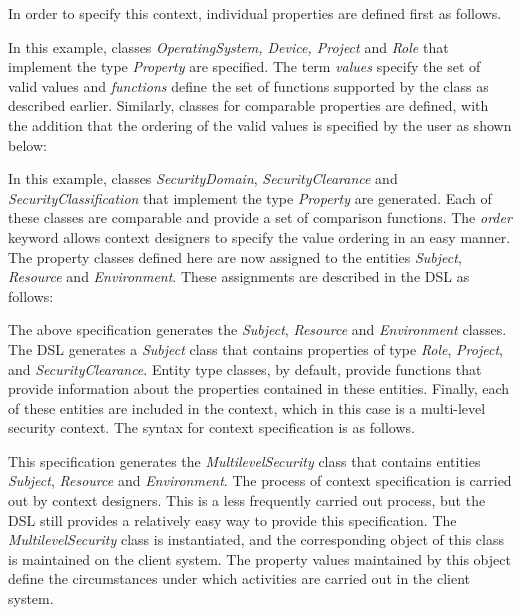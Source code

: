 In order to specify this context, individual properties are defined first as follows. 


	
In this example, classes  {\em OperatingSystem, Device, Project} and {\em Role} that implement the type {\em Property} are specified. The term {\em values} specify the set of valid values and {\em functions} define the set of functions supported by the class as described earlier. Similarly, classes for comparable properties are defined, with the addition that the ordering of the valid values is specified by the user as shown below: 



In this example, classes {\em SecurityDomain}, {\em SecurityClearance} and {\em SecurityClassification} that implement the type {\em Property} are generated. Each of these classes are comparable and provide a set of comparison functions. The {\em order} keyword allows context designers to specify the value ordering in an easy manner. The property classes defined here are now assigned to the entities {\em Subject}, {\em Resource} and {\em Environment}. These assignments are described in the DSL as follows: 



The above specification generates the {\em Subject}, {\em Resource} and {\em Environment} classes. The DSL generates a {\em Subject} class that contains properties of type {\em Role}, {\em Project}, and {\em SecurityClearance}. Entity type classes, by default, provide functions that provide information about the  properties contained in these entities. Finally, each of these entities are included in the context, which in this case is a multi-level security context. The syntax for context specification is as follows. 



This specification generates the {\em MultilevelSecurity} class that contains entities {\em Subject}, {\em Resource} and {\em Environment}. The process of context specification is carried out by context designers. This is a less frequently carried out process, but the DSL still provides a relatively easy way to provide this specification. The {\em MultilevelSecurity} class is instantiated, and the corresponding object of this class is maintained on the client system. The property values maintained by this object define the circumstances under which activities are carried out in the client system. 

